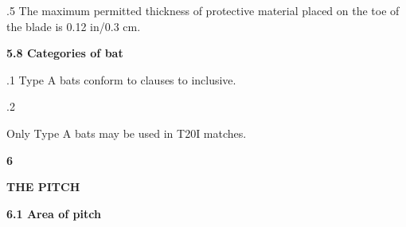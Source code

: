 \documentclass[12pt]{article}
\begin{document}
\vspace{\baselineskip}

\vspace{\baselineskip}

\vspace{\baselineskip}
\begin{adjustwidth}{0.0in}{-0.01in}
\begin{Center}
{\fontsize{8pt}{9.6pt}\par}
\end{Center}\par

\end{adjustwidth}


\vspace{\baselineskip}
{\fontsize{9pt}{10.8pt}.5 \tabto{0.49in} The maximum permitted thickness of protective material placed on the toe of the blade is 0.12 in/0.3 cm.\par}\par


\vspace{\baselineskip}
{\fontsize{11pt}{13.2pt}\selectfont \textbf{5.8 \tabto{0.47in} Categories of bat}\par}\par


\vspace{\baselineskip}
{\fontsize{9pt}{10.8pt}.1 \tabto{0.49in} Type A bats conform to clauses to inclusive.\par}\par


\vspace{\baselineskip}
{\fontsize{9pt}{10.8pt}.2 \tabto{0.49in} {\fontsize{8pt}{9.6pt}\selectfont Only Type A bats may be used in T20I matches.\par}\par}\par


\vspace{\baselineskip}
{\fontsize{16pt}{19.2pt}\selectfont \textbf{6 \tabto{0.29in} }{\fontsize{15pt}{18.0pt}\selectfont \textbf{THE PITCH}\par}\par}\par


\vspace{\baselineskip}
{\fontsize{11pt}{13.2pt}\selectfont \textbf{6.1 \tabto{0.47in} Area of pitch}\par}\par
\end{document}
